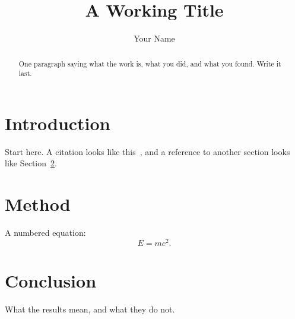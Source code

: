 \documentclass[sigconf]{acmart}
\begin{document}
\title{A Working Title}

\author{Your Name}

\begin{abstract}
  One paragraph saying what the work is, what you did, and what you found.
  Write it last.
\end{abstract}


\maketitle

\section{Introduction}
\label{sec:introduction}

Start here.  A citation looks like this~\cite{knuth1984}, and a reference to
another section looks like Section~\ref{sec:method}.

\section{Method}
\label{sec:method}

A numbered equation:
\begin{equation}
  \label{eq:example}
  E = mc^2.
\end{equation}

\section{Conclusion}

What the results mean, and what they do not.



\end{document}
